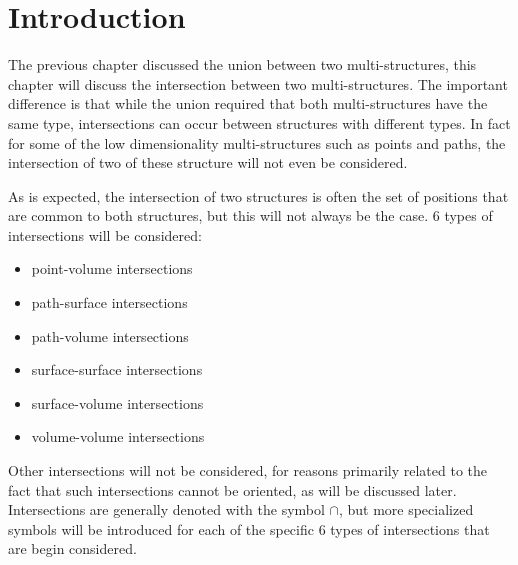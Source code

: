 \documentclass{book}
\begin{document}
\section{Introduction}

The previous chapter discussed the union between two multi-structures, this chapter will discuss the intersection between two multi-structures. The important difference is that while the union required that both multi-structures have the same type, intersections can occur between structures with different types. In fact for some of the low dimensionality multi-structures such as points and paths, the intersection of two of these structure will not even be considered.

As is expected, the intersection of two structures is often the set of positions that are common to both structures, but this will not always be the case. 6 types of intersections will be considered: 
\begin{itemize}
\item point-volume intersections 
\item path-surface intersections 
\item path-volume intersections 
\item surface-surface intersections 
\item surface-volume intersections 
\item volume-volume intersections
\end{itemize}
Other intersections will not be considered, for reasons primarily related to the fact that such intersections cannot be oriented, as will be discussed later. Intersections are generally denoted with the symbol \(\cap\), but more specialized symbols will be introduced for each of the specific 6 types of intersections that are begin considered. 

\vspace{5mm}
\end{document}
